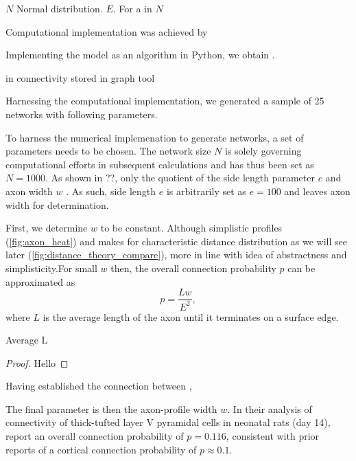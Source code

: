 $N$ Normal distribution. $E$. For a in $N$ 

Computational implementation was achieved by 




Implementing the model as an algorithm in Python, we obtain .

 in connectivity stored in graph
tool \parencite{graph_tool} %

Harnessing the computational implementation, we generated a sample of
25 networks with following parameters. 



To harness the numerical implemenation to generate networks, a set
of parameters needs to be chosen. The network size $N$ is solely
governing computational efforts in subsequent calculations and has
thus been set as $N = 1000$. As shown in ??, only the quotient of
the side length parameter $e$ and axon width $w$  . As such, side
length $e$ is arbitrarily set as $e = 100$ and leaves axon width for
determination. 

First, we determine $w$ to be constant. Although simplistic profiles
(\autoref{fig:axon_heat}) and makes for characteristic distance
distribution as we will see later
(\autoref{fig:distance_theory_compare}), more in line with idea of
abstractness and simplisticity.For small $w$ then, the overall
connection probability $p$ can be approximated as
\[
p = \frac{L w}{E^2},
\]
where $L$ is the average length of the axon until it terminates on a
surface edge. 

\begin{proposition}
Average L
\end{proposition}

\begin{proof}
Hello
\end{proof}

Having established the connection between , 


The final parameter is then the axon-profile width $w$. In their
analysis of connectivity of thick-tufted layer V pyramidal cells in
neonatal rats (day 14), \textcite{Song2005} report an overall connection
probability of $p=0.116$, consistent with prior reports of a cortical
connection probability of $p \approx 0.1$. %


